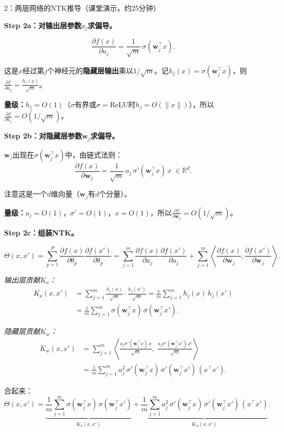 \documentclass[11pt,a4paper]{article}
\newcommand{\R}{\mathbb{R}}
\newcommand{\bw}{\mathbf{w}}
\begin{document}
\begin{handcalc}{2：两层网络的NTK推导（课堂演示，约25分钟）}

\textbf{Step 2a：对输出层参数$a_j$求偏导。}

\[
\frac{\partial f(x)}{\partial a_j} = \frac{1}{\sqrt{m}}\,\sigma(\bw_j^\top x).
\]

这是$x$经过第$j$个神经元的\textbf{隐藏层输出}乘以$1/\sqrt{m}$。记$h_j(x) = \sigma(\bw_j^\top x)$，则$\frac{\partial f}{\partial a_j} = \frac{h_j(x)}{\sqrt{m}}$。

\textbf{量级：}$h_j = O(1)$（$\sigma$有界或$\sigma=\text{ReLU}$时$h_j = O(\|x\|)$），所以$\frac{\partial f}{\partial a_j} = O(1/\sqrt{m})$。

\bigskip
\textbf{Step 2b：对隐藏层参数$\bw_j$求偏导。}

$\bw_j$出现在$\sigma(\bw_j^\top x)$中，由链式法则：
\[
\frac{\partial f(x)}{\partial \bw_j} = \frac{1}{\sqrt{m}}\,a_j\,\sigma'(\bw_j^\top x)\,x \;\in\R^d.
\]

注意这是一个$d$维向量（$\bw_j$有$d$个分量）。

\textbf{量级：}$a_j=O(1)$，$\sigma'=O(1)$，$x=O(1)$，所以$\frac{\partial f}{\partial \bw_j} = O(1/\sqrt{m})$。

\bigskip
\textbf{Step 2c：组装NTK。}

\[
\Theta(x,x') = \sum_{p=1}^P \frac{\partial f(x)}{\partial\theta_p}\frac{\partial f(x')}{\partial\theta_p} = \sum_{j=1}^m \frac{\partial f(x)}{\partial a_j}\frac{\partial f(x')}{\partial a_j} + \sum_{j=1}^m \left\langle\frac{\partial f(x)}{\partial\bw_j}, \frac{\partial f(x')}{\partial\bw_j}\right\rangle.
\]

\textit{输出层贡献$K_a$：}
\begin{align}
K_a(x,x') &= \sum_{j=1}^m \frac{h_j(x)}{\sqrt{m}}\cdot\frac{h_j(x')}{\sqrt{m}} = \frac{1}{m}\sum_{j=1}^m h_j(x)\,h_j(x') \\
&= \frac{1}{m}\sum_{j=1}^m \sigma(\bw_j^\top x)\,\sigma(\bw_j^\top x').
\end{align}

\textit{隐藏层贡献$K_w$：}
\begin{align}
K_w(x,x') &= \sum_{j=1}^m \left\langle \frac{a_j\sigma'(\bw_j^\top x)\,x}{\sqrt{m}},\; \frac{a_j\sigma'(\bw_j^\top x')\,x'}{\sqrt{m}} \right\rangle \\
&= \frac{1}{m}\sum_{j=1}^m a_j^2\,\sigma'(\bw_j^\top x)\,\sigma'(\bw_j^\top x')\,(x^\top x').
\end{align}

合起来：
\begin{equation}
\boxed{\Theta(x,x') = \underbrace{\frac{1}{m}\sum_{j=1}^m \sigma(\bw_j^\top x)\,\sigma(\bw_j^\top x')}_{K_a(x,x')} + \underbrace{\frac{1}{m}\sum_{j=1}^m a_j^2\,\sigma'(\bw_j^\top x)\,\sigma'(\bw_j^\top x')\,(x^\top x')}_{K_w(x,x')}.}
\end{equation}


\end{handcalc}
\end{document}
